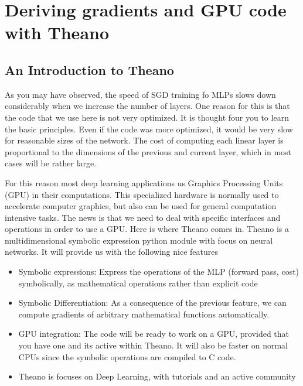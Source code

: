 \section{Deriving gradients and GPU code with Theano}

\subsection{An Introduction to Theano}

As you may have observed, the speed of SGD training fo MLPs slows down considerably when we increase the number of layers. One reason for this is that the code that we use here is not very optimized. It is thought four you to learn the basic principles. Even if the code was more optimized, it would be very slow for reasonable sizes of the network. The cost of computing each linear layer is proportional to the dimensions of the previous and current layer, which in most cases will be rather large. 

For this reason most deep learning applications us Graphics Processing Units (GPU) in their computations. This specialized hardware is normally used to accelerate computer graphics, but also can be used for general computation intensive tasks. The news is that we need to deal with specific interfaces and operations in order to use a GPU. Here is where Theano comes in. Theano is a multidimensional symbolic expression python module with focus on neural networks. It will provide us with the following nice features

\begin{itemize}
\item Symbolic expressions: Express the operations of the MLP (forward pass, cost) symbolically, as mathematical operations rather than explicit code 
\item Symbolic Differentiation: As a consequence of the previous feature, we can compute gradients of arbitrary mathematical functions automatically.   
\item GPU integration: The code will be ready to work on a GPU, provided that you have one and its active within Theano. It will also be faster on normal CPUs since the symbolic operations are compiled to C code. 
\item Theano is focuses on Deep Learning, with tutorials and an active community   
\end{itemize}

